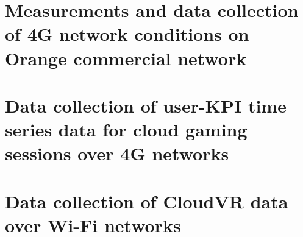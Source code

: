 \section{Measurements and data collection of 4G network conditions on Orange commercial network}



\section{Data collection of user-KPI time series data for cloud gaming sessions over 4G networks}


\section{Data collection of CloudVR data over Wi-Fi networks}
